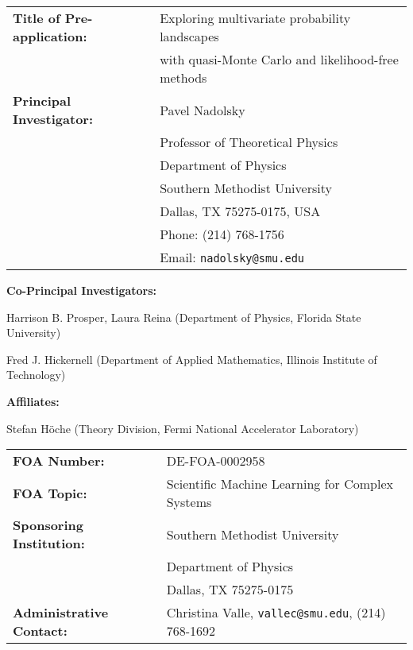 \documentclass[11pt,titlepage,
preprint,
aps,prd,
nofootinbib,
superscriptaddress,
showpacs,
amsmath,
amssymb
]{article}
\begin{document}
\large
\begin{tabular*}{1.5\textwidth}[]{ll}
{\bf Title of Pre-application:} & Exploring multivariate probability landscapes \\ 
& with quasi-Monte Carlo and likelihood-free methods\vspace{6pt} \\
{\bf Principal Investigator: } 
& Pavel Nadolsky \\
& Professor of Theoretical Physics \\
& Department of Physics \\
& Southern Methodist University \\ 
& Dallas, TX 75275-0175, USA      \\
& Phone:  (214) 768-1756 \\
& Email: \texttt{nadolsky@smu.edu} 
\end{tabular*}

\vspace{12pt}
{\bf Co-Principal Investigators:} 
\vspace{3pt}

Harrison B. Prosper, Laura Reina (Department of Physics, Florida State University)

Fred J. Hickernell (Department of Applied Mathematics, Illinois Institute of Technology)

\vspace{12pt}

{\bf Affiliates:}
\vspace{6pt}


Stefan H\"oche (Theory Division, Fermi National Accelerator Laboratory)

\vspace{12pt}

\begin{tabular}{ll}
{\bf FOA Number:} & DE-FOA-0002958 \vspace{6pt} \\
{\bf FOA Topic:} & Scientific Machine Learning for Complex Systems \vspace{12pt} \\
{\bf Sponsoring Institution:} & Southern Methodist University \\
& Department of Physics \\
& Dallas, TX 75275-0175 \vspace{6pt} \\
{\bf Administrative Contact:} & Christina Valle, 
\texttt{vallec@smu.edu}, (214) 768-1692
\end{tabular}

\clearpage

\vspace{0.2cm}
\end{document}
